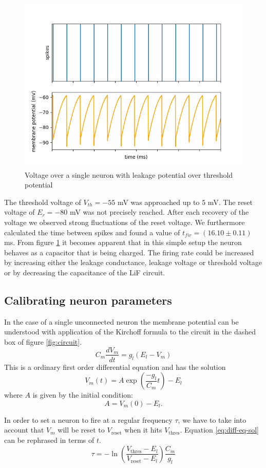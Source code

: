 \documentclass[a4paper,twocolumn]{article}
\begin{document}
\begin{figure}[ht]
    \centering
    \includegraphics[width=.5\textwidth]{figures/fp_task1_1membrane.png}
    \caption{Voltage over a single neuron with leakage potential over threshold potential}
    \label{fig:membranes_ex1}
\end{figure}

The threshold voltage of $V_{th} = -55$ mV was approached up to $5$ mV.  The
reset voltage of $E_r = -80$ mV was not precisely reached.  After each recovery
of the voltage we observed strong fluctuations of the reset voltage.  We
furthermore calculated the time between spikes and found a value of
$t_{fir} = (16.10\pm 0.11)$ ms.  From figure \ref{fig:membranes_ex1} it becomes
apparent that in this simple setup the neuron behaves as a capacitor that is
being charged.  The firing rate could be increased by increasing either the
leakage conductance,  leakage voltage or threshold voltage or by decreasing
the capacitance of the LiF circuit.

\subsection{Calibrating neuron parameters}

In the case of a single unconnected neuron the membrane potential can be
understood with application of the Kirchoff formula to the circuit in the dashed
box of figure \ref{fig:circuit}.
\[
    C_m \frac{dV_m}{dt} = g_l(E_l - V_m)
\]
This is a ordinary first order differential equation and has the
solution
\begin{equation}
    V_m(t) = A \exp(\frac{-g_l}{C_m}t) - E_l
    \label{eq:diff-eq-sol}
\end{equation}
where $A$ is given by the initial condition:
\[
    A = V_m(0) - E_l.
\]

In order to set a neuron to fire at a regular frequency $\tau$, we have to take
into account that $V_m$ will be reset to $V_\text{reset}$ when it hits
$V_\text{thres}$. Equation \eqref{eq:diff-eq-sol} can be rephrased in terms of
$t$.
\begin{equation}
    \tau = -\ln(\frac{V_\text{thres} - E_l}{V_\text{reset} - E_l})
    \frac{C_m}{g_l}
    \label{eq:tau}
\end{equation}
\end{document}
